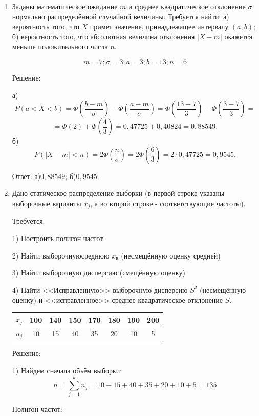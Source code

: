 \documentclass{article}
\begin{document}
\begin{enumerate}
\item %
Заданы математическое ожидание $m$ и среднее квадратическое отклонение $\sigma$ нормально распределённой случайной величины. \newline
Требуется найти: а) вероятность того, что $X$ примет значение, принадлежащее интервалу $(a, b)$; \newline
б) вероятность того, что абсолютная величина отклонения $|X-m|$ окажется меньше положительного числа $n$.

$$m=7;\sigma=3;a=3;b=13;n=6$$
\begin{center}Решение:\end{center}
а) $$P(a<X<b)=\Phi\left(\frac{b-m}{\sigma}\right)-\Phi\left(\frac{a-m}{\sigma}\right)=\Phi\left(\frac{13-7}{3}\right)-\Phi\left(\frac{3-7}{3}\right)=$$
$$=\Phi(2)+\Phi\left(\frac{4}{3}\right)=0,47725+0,40824=0,88549.$$
б)
$$P (|X-m| < n)= 2\Phi\left(\frac{n}{\sigma}\right)=2\Phi\left(\frac{6}{3}\right)=2\cdot0,47725=0,9545.$$

Ответ: а)$0,88549$; б)$0,9545$.

\item %
Дано статическое распределение выборки (в первой строке указаны выборочные варианты $x_j$, а во второй строке - соответствующие частоты).

Требуется:

1) Построить полигон частот.

2) Найти выборочнуюсреднюю $x_\textit{в}$ (несмещённую оценку средней)

3) Найти выборочную дисперсию (смещённую оценку)

4) Найти <<Исправленную>> выборочную дисперсию $S^2$ (несмещённую оценку) и <<исправленное>> среднее квадратическое отклонение $S$.

\begin{center}
\begin{tabular}{|c|c|c|c|c|c|c|c|}
\hline
$x_j$ & 100 & 140 & 150 & 170 & 180 & 190 & 200 \\
\hline
$n_j$ & 10 & 15 & 40 & 35 & 20 & 10 & 5 \\
\hline
\end{tabular}
\end{center}
\begin{center}Решение:\end{center}
1) Найдем сначала объём выборки: $$n=\sum_{j=1}^k n_j=10+15+40+35+20+10+5=135$$

Полигон частот:


\end{enumerate}
\end{document}
